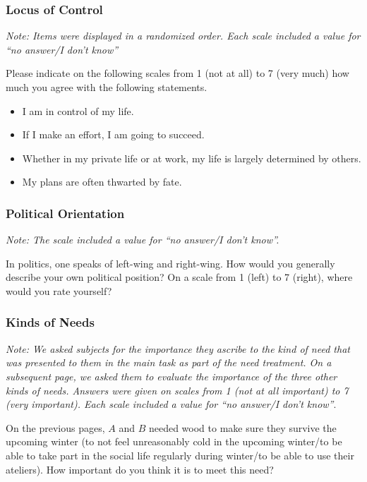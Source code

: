 \documentclass[egregdoesnotlikesansseriftitles]{scrartcl}
\begin{document}
\subsubsection*{Locus of Control}
\noindent\textit{Note: Items were displayed in a randomized order. Each scale included a value for ``no answer/I don't know''}\vspace{1ex}

\noindent Please indicate on the following scales from 1 (not at all) to 7 (very much) how much you agree with the following statements.
\begin{itemize}
   \item I am in control of my life.
   \item If I make an effort, I am going to succeed.
   \item Whether in my private life or at work, my life is largely determined by others.
   \item My plans are often thwarted by fate.
\end{itemize}

\subsubsection*{Political Orientation}
\noindent\textit{Note: The scale included a value for ``no answer/I don't know''.}\vspace{1ex}

\noindent In politics, one speaks of left-wing and right-wing.
How would you generally describe your own political position?
On a scale from 1 (left) to 7 (right), where would you rate yourself?

\subsubsection*{Kinds of Needs}
\noindent\textit{Note: We asked subjects for the importance they ascribe to the kind of need that was presented to them in the main task as part of the need treatment.
On a subsequent page, we asked them to evaluate the importance of the three other kinds of needs.
Answers were given on scales from 1 (not at all important) to 7 (very important).
Each scale included a value for ``no answer/I don't know''}.\vspace{1ex}

\noindent On the previous pages, $A$ and $B$ needed wood to make sure they survive the upcoming winter (to not feel unreasonably cold in the upcoming winter/to be able to take part in the social life regularly during winter/to be able to use their ateliers).
How important do you think it is to meet this need?\vspace{1ex}
\end{document}
